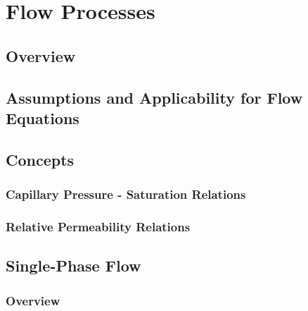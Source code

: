 %
%

\section{Flow Processes}         
\label{sec:flow}

\subsection{Overview}

\subsection{Assumptions and Applicability for Flow Equations}

\subsection{Concepts}

\subsubsection{Capillary Pressure - Saturation Relations}  
\label{sec:pc_s_relations}

\subsubsection{Relative Permeability Relations}  
\label{sec:RelativePerm}


\subsection{Single-Phase Flow}
\label{sec:single-phase-flow}

\subsubsection{Overview}
\label{sec:single-phase-overview}

